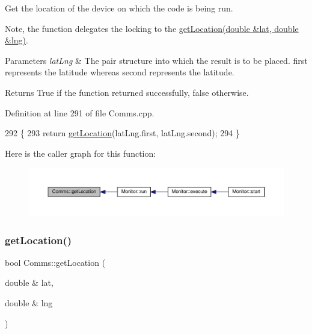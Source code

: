Get the location of the device on which the code is being run.

Note, the function delegates the locking to the \hyperlink{class_comms_a083b399b3115711b1e2d55f800cac58c}{get\+Location(double \&lat, double \&lng)}.


\begin{DoxyParams}{Parameters}
{\em lat\+Lng} & The pair structure into which the result is to be placed. \textquotesingle{}first\textquotesingle{} represents the latitude whereas \textquotesingle{}second\textquotesingle{} represents the latitude. \\
\hline
\end{DoxyParams}
\begin{DoxyReturn}{Returns}
True if the function returned successfully, false otherwise. 
\end{DoxyReturn}


Definition at line 291 of file Comms.\+cpp.


\begin{DoxyCode}
292 \{
293     \textcolor{keywordflow}{return} \hyperlink{class_comms_a26030245503e82aa6278e39cd0886c31}{getLocation}(latLng.first, latLng.second);
294 \}
\end{DoxyCode}
Here is the caller graph for this function\+:
\nopagebreak
\begin{figure}[H]
\begin{center}
\leavevmode
\includegraphics[width=350pt]{d8/dcc/class_comms_a26030245503e82aa6278e39cd0886c31_icgraph}
\end{center}
\end{figure}
\mbox{\label{class_comms_a083b399b3115711b1e2d55f800cac58c}} 
\subsubsection{\texorpdfstring{get\+Location()}{getLocation()}\hspace{0.1cm}{\footnotesize\ttfamily [2/2]}}
{\footnotesize\ttfamily bool Comms\+::get\+Location (\begin{DoxyParamCaption}\item[{double \&}]{lat,  }\item[{double \&}]{lng }\end{DoxyParamCaption})}

